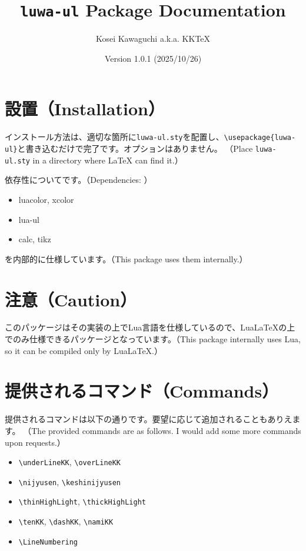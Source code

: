 \documentclass[luatex,fontsize=8pt,paper=b5,twoside]{jlreq}%
\title{\texttt{luwa-ul} Package Documentation}
\author{Kosei Kawaguchi a.k.a. KKTeX}
\date{Version 1.0.1 (2025/10/26)}
\begin{document}
\begin{titlepage}
  \maketitle
\end{titlepage}
\newpage
\tableofcontents
\newpage

\section{設置（Installation）}
インストール方法は、適切な箇所に\texttt{luwa-ul.sty}を配置し、\verb|\usepackage{luwa-ul}|と書き込むだけで完了です。オプションはありません。
（Place \texttt{luwa-ul.sty} in a directory where LaTeX can find it.）

依存性についてです。（Dependencies: ）

\begin{itemize}
  \item luacolor, xcolor
  \item lua-ul
  \item calc, tikz
\end{itemize}

\noindent を内部的に仕様しています。（This package uses them internally.）

\section{注意（Caution）}
このパッケージはその実装の上でLua言語を仕様しているので、LuaLaTeXの上でのみ仕様できるパッケージとなっています。（This package internally uses Lua, so it can be compiled only by LuaLaTeX.）

\section{提供されるコマンド（Commands）}
提供されるコマンドは以下の通りです。要望に応じて追加されることもありえます。
（The provided commands are as follows. I would add some more commands upon requests.）

\begin{itemize}
  \item \verb|\underLineKK|, \verb|\overLineKK|
  \item \verb|\nijyusen|, \verb|\keshinijyusen|
  \item \verb|\thinHighLight|, \verb|\thickHighLight|
  \item \verb|\tenKK|, \verb|\dashKK|, \verb|\namiKK|
  \item \verb|\LineNumbering|
\end{itemize}
\end{document}
